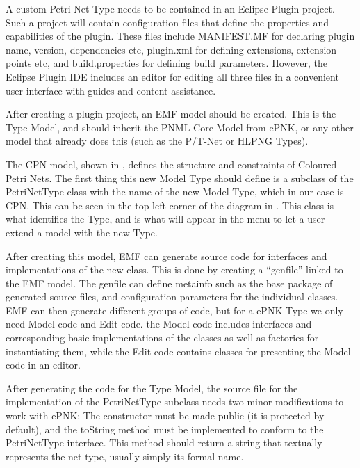 A custom Petri Net Type needs to be contained in an Eclipse Plugin project.
Such a project will contain configuration files that define the properties and
capabilities of the plugin. These files include MANIFEST.MF for declaring plugin
name, version, dependencies etc, plugin.xml for defining extensions, extension
points etc, and build.properties for defining build parameters. However, the
Eclipse Plugin IDE includes an editor for editing all three files in a
convenient user interface with guides and content assistance.

After creating a plugin project, an EMF model should be created. This is the
Type Model, and should inherit the PNML Core Model from ePNK, or any other model
that already does this (such as the P/T-Net or HLPNG Types). 

The CPN model, shown in , defines the structure and
constraints of Coloured Petri Nets. The first thing this new Model Type should
define is a subclass of the PetriNetType class with the name of the new Model
Type, which in our case is CPN. This can be seen in the top left corner of the
diagram in . This class is what identifies the Type,
and is what will appear in the menu to let a user extend a model with the new
Type.

After creating this model, EMF can generate source code for interfaces and
implementations of the new class. This is done by creating a ``genfile''
linked to the EMF model. The genfile can define metainfo such as the base
package of generated source files, and configuration parameters for the
individual classes. EMF can then generate different groups of code, but for a
ePNK Type we only need Model code and Edit code. the Model code includes
interfaces and corresponding basic implementations of the classes as well as
factories for instantiating them, while the Edit code contains classes for
presenting the Model code in an editor.

After generating the code for the Type Model, the source file for
the implementation of the PetriNetType subclass needs two minor modifications
to work with ePNK: The constructor must be made public (it is protected by
default), and the toString method must be implemented to conform to the
PetriNetType interface. This method should return a string that textually
represents the net type, usually simply its formal name.

